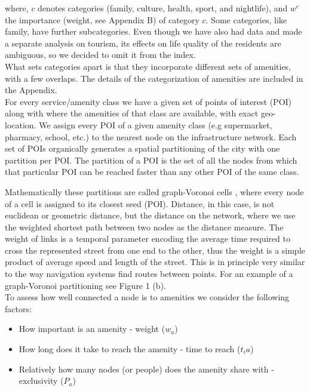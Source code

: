 where, $c$ denotes categories (family, culture, health, sport, and nightlife), and $w^c$ the importance (weight, see Appendix B) of category $c$.
Some categories, like family, have further subcategories. Even though we have also had data and made a separate analysis on tourism, its effects on life quality of the residents are ambiguous, so we decided to omit it from the index.\\

What sets categories apart is that they incorporate different sets of amenities, with a few overlaps. The details of the categorization of amenities are included in the Appendix. \\

For every service/amenity class we have a given set of points of interest (POI) along with where the amenities of that class are available, with exact geo-location. We assign every POI of a given amenity class (e.g supermarket, pharmacy, school, etc.) to the nearest node on the infrastructure network. Each set of POIs organically generates a spatial partitioning of the city with one partition per POI. The partition of a POI is the set of all the nodes from which that particular POI can be reached faster than any other POI of the same class.

Mathematically these partitions are called graph-Voronoi cells \cite{erwing_2000,Deritei2014}, where every node of a cell is assigned to its closest seed (POI). Distance, in this case, is not euclidean or geometric distance, but the distance on the network, where we use the weighted shortest path between two nodes as the distance measure. The weight of links is a temporal parameter encoding the average time required to cross the represented street from one end to the other, thus the weight is a simple product of average speed and length of the street. This is in principle very similar to the way navigation systems find routes between points. For an example of a graph-Voronoi partitioning see Figure 1 (b).\\
To assess how well connected a node is to amenities we consider the following factors:
\begin{itemize}
	\item How important is an amenity - weight ($w_a$)
	\item How long does it take to reach the amenity - time to reach ($t_ia$)
	\item Relatively how many nodes (or people) does the amenity share with - exclusivity ($P_a$)
\end{itemize}

